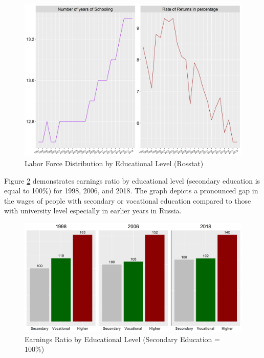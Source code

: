 \documentclass[alpha-refs]{wiley-article-01g}
\begin{document}
\vspace{-0.2in}

\begin{center}
	\begin{figure}[htbp!]
\begin{minipage}[b]{1\linewidth}
			\centering
			\hspace*{-0.7in}
			\includegraphics[width=5in]{hp_rs.png}
		\end{minipage}
			\caption{Labor Force Distribution by Educational Level (Rosstat)}\label{fig:1.01a}
	\end{figure}
\end{center}


\vspace{-2em}
Figure \ref{fig:5.1} demonstrates earnings ratio by educational level (secondary education is equal to 100\%) for 1998, 2006, and 2018. The graph depicts a pronounced gap in the wages of people with secondary or vocational education compared to those with university level especially in earlier years in Russia.

\vspace{-0.2in}
\begin{center}
	\begin{figure}[htbp!]
\begin{minipage}[b]{1\linewidth}
			\centering
			\includegraphics[width=6in]{earnings_ratio.png}
		\end{minipage}
			\caption{Earnings Ratio by Educational Level (Secondary Education = 100\%)}\label{fig:5.1}
	\end{figure}
\end{center}
\end{document}
